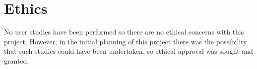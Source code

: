 \chapter{Ethics}

No user studies have been performed so there are no ethical concerns with this project. However, in the initial planning of this project there was the possibility that such studies could have been undertaken, so ethical approval was sought and granted.